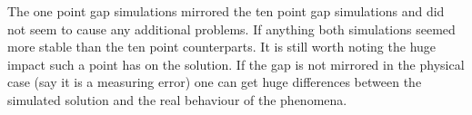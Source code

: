 \documentclass[twoside]{article}
\begin{document}
The one point gap simulations mirrored the ten point gap simulations and did not seem to cause any additional problems. If anything both simulations seemed more stable than the ten point counterparts. It is still worth noting the huge impact such a point has on the solution. If the gap is not mirrored in the physical case (say it is a measuring error) one can get huge differences between the simulated solution and the real behaviour of the phenomena. 

\printindex
\end{document}
